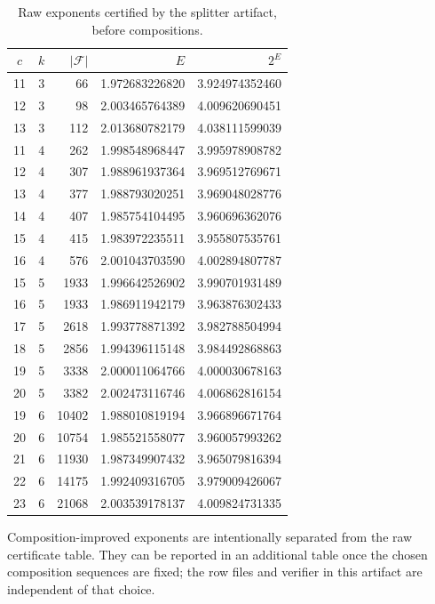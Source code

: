\begin{table}[t]
\centering
\caption{Raw exponents certified by the splitter artifact, before compositions.}
\label{tab:raw-splitter-exponents}
\begin{tabular}{ccrrr}
\hline
$c$ & $k$ & $|\mathcal F|$ & $E$ & $2^E$ \\
\hline
11 & 3 & 66 & 1.972683226820 & 3.924974352460 \\
12 & 3 & 98 & 2.003465764389 & 4.009620690451 \\
13 & 3 & 112 & 2.013680782179 & 4.038111599039 \\
11 & 4 & 262 & 1.998548968447 & 3.995978908782 \\
12 & 4 & 307 & 1.988961937364 & 3.969512769671 \\
13 & 4 & 377 & 1.988793020251 & 3.969048028776 \\
14 & 4 & 407 & 1.985754104495 & 3.960696362076 \\
15 & 4 & 415 & 1.983972235511 & 3.955807535761 \\
16 & 4 & 576 & 2.001043703590 & 4.002894807787 \\
15 & 5 & 1933 & 1.996642526902 & 3.990701931489 \\
16 & 5 & 1933 & 1.986911942179 & 3.963876302433 \\
17 & 5 & 2618 & 1.993778871392 & 3.982788504994 \\
18 & 5 & 2856 & 1.994396115148 & 3.984492868863 \\
19 & 5 & 3338 & 2.000011064766 & 4.000030678163 \\
20 & 5 & 3382 & 2.002473116746 & 4.006862816154 \\
19 & 6 & 10402 & 1.988010819194 & 3.966896671764 \\
20 & 6 & 10754 & 1.985521558077 & 3.960057993262 \\
21 & 6 & 11930 & 1.987349907432 & 3.965079816394 \\
22 & 6 & 14175 & 1.992409316705 & 3.979009426067 \\
23 & 6 & 21068 & 2.003539178137 & 4.009824731335 \\
\hline
\end{tabular}
\end{table}

Composition-improved exponents are intentionally separated from the raw
certificate table.  They can be reported in an additional table once the chosen
composition sequences are fixed; the row files and verifier in this artifact are
independent of that choice.
